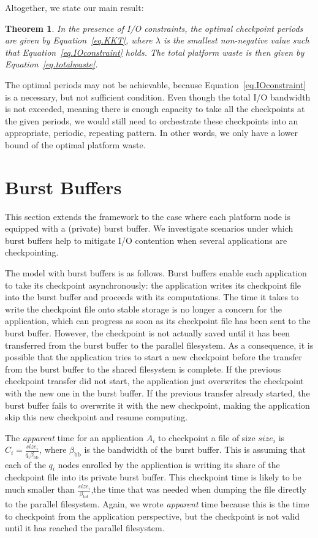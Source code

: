 \documentclass[two]{article}
\newtheorem{theorem}{Theorem}
\newcommand{\bandtotal}{\beta_{\text{tot}}}
\newcommand{\app}[1]{A_{#1}}
\newcommand{\nbnodes}[1]{q_{#1}}
\newcommand{\ckpt}[1]{C_{#1}}
\newcommand{\size}[1]{\mathit{size}_{#1}}
\newcommand{\bwbb}{\beta_{\text{bb}}}
\begin{document}
Altogether, we state our main result:

\begin{theorem}
     In the presence of I/O constraints, the optimal checkpoint periods are given by
     Equation~\eqref{eq.KKT}, where $\lambda$ is the smallest non-negative value such
     that Equation~\eqref{eq.IOconstraint} holds. The total platform waste is then
     given by Equation~\eqref{eq.totalwaste}.
\end{theorem}

The optimal periods may not be achievable, because
Equation~\eqref{eq.IOconstraint} is a necessary, but not sufficient condition.
Even though the total I/O bandwidth is not exceeded, meaning there is enough
capacity to take all the checkpoints at the given periods, we would still need
to orchestrate these checkpoints into an appropriate, periodic, repeating
pattern.  In other words, we only have a lower bound of the optimal platform
waste.

\section{Burst Buffers}

This section extends the framework to the case where each platform node is equipped with
a (private) burst buffer. We investigate scenarios under which burst buffers help to mitigate I/O contention
when several applications are checkpointing.

The model with burst buffers is as follows.  Burst buffers enable each
application to take its checkpoint asynchronously: the application
writes its checkpoint file into the burst buffer and proceeds with its
computations. The time it takes to write the checkpoint file onto
stable storage is no longer a concern for the application, which can
progress as soon as its checkpoint file has been sent to the burst
buffer. However, the checkpoint is not actually saved until it has
been transferred from the burst buffer to the parallel filesystem. As
a consequence, it is possible that the application tries to start a
new checkpoint before the transfer from the burst buffer to the shared
filesystem is complete. If the previous checkpoint transfer did not
start, the application just overwrites the checkpoint with the new one
in the burst buffer. If the previous transfer already started, the
burst buffer fails to overwrite it with the new checkpoint, making
the application skip this new checkpoint and resume computing.
 
The \emph{apparent} time for an application $\app{i}$ to checkpoint a
file of size $\size{i}$ is
$\ckpt{i} = \frac{\size{i}}{\nbnodes{i} \bwbb}$, where $\bwbb$ is the
bandwidth of the burst buffer. This is assuming that each of the
$\nbnodes{i}$ nodes enrolled by the application is writing its share
of the checkpoint file into its private burst buffer. This checkpoint
time is likely to be much smaller than
$\frac{\size{i}}{\bandtotal}$,the time that was needed when dumping
the file directly to the parallel filesystem.  Again, we wrote
\emph{apparent} time because this is the time to checkpoint from the
application perspective, but the checkpoint is not valid until it has
reached the parallel filesystem.
 
\end{document}
